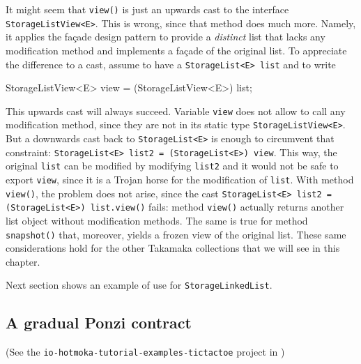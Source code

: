 \begin{commentbox}
It might seem that \texttt{view()} is just an upwards cast to the
interface \texttt{StorageListView<E>}. This is wrong, since that method
does much more. Namely, it applies the façade design pattern
to provide a \emph{distinct} list that lacks any modification method
and implements a façade of the original list.
To appreciate the difference to a cast, assume to have a \texttt{StorageList<E> list} and to write
%
\begin{codebox}\begin{javalst}
StorageListView<E> view = (StorageListView<E>) list;
\end{javalst}\end{codebox}
%
This upwards cast will always succeed.
Variable \texttt{view} does not allow to call any modification method, since they
are not in its static type \texttt{StorageListView<E>}. But a downwards cast back
to \texttt{StorageList<E>} is enough to circumvent
that constraint: \texttt{StorageList<E> list2 = (StorageList<E>) view}.
This way, the original \texttt{list}
can be modified by modifying \texttt{list2} and it would not be safe to export
\texttt{view}, since it
is a Trojan horse for the modification of \texttt{list}. With method \texttt{view()}, the
problem does not arise, since the cast \texttt{StorageList<E> list2 = (StorageList<E>) list.view()}
fails: method \texttt{view()} actually returns another list object without modification methods.
The same is true for method \texttt{snapshot()} that, moreover, yields a frozen view of the
original list. These same considerations hold for the other Takamaka collections that we will
see in this chapter.
\end{commentbox}

Next section shows an example of use for \texttt{StorageLinkedList}.

\subsection{A gradual Ponzi contract}\label{subsec:gradual_ponzi}

\begin{center}
(See the \texttt{io-hotmoka-tutorial-examples-tictactoe} project in \hotmokaRepo{})
\end{center}

